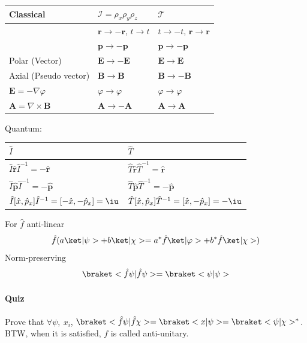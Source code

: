 \begin{center}
  \begin{minipage}[t]{.64\linewidth}
    \centering
    \begin{tabular}{*3l}
      \toprule
      Classical & $\mathcal I = \rho_x \rho_y \rho_z$ & $\mathcal T$\\
      \midrule
      & $\bm r \to -\bm r$, $t \to t$ &
      $t \to -t$, $\bm r \to \bm r$\\
      & $\bm p \to -\bm p$ & $\bm p \to -\bm p$\\
      \midrule
      Polar (Vector) & $\bm E \to -\bm E$ & $\bm E \to \bm E$\\
      Axial (Pseudo vector) & $\bm B \to \bm B$ & $\bm B \to -\bm B$\\
      $\bm E = -\nabla\varphi$ & $\varphi \to \varphi$ & $\varphi \to \varphi$\\
      $\bm A = \nabla \times \bm B$ & $\bm A \to -\bm A$ & $\bm A \to \bm A$\\
      \bottomrule
    \end{tabular}
  \end{minipage} \hfill
  \begin{minipage}[t]{.32\linewidth}
  Quantum:

  \begin{tabular}{ll}
    \toprule
    $\hat I$ & $\hat T$\\
    \midrule
    $\hat I \hat{\bm r} \hat I^{-1} = -\hat{\bm r}$ &
    $\hat T\hat{\bm r}\hat T^{-1} = \hat{\bm r}$\\
    $\hat I \hat{\bm p} \hat I^{-1} = -\hat{\bm p}$ &
    $\hat T\hat{\bm p}\hat T^{-1} = -\hat{\bm p}$\\
    $\hat I[\hat x, \hat p_x]\hat I^{-1} = [-\hat x, -\hat p_x] = \iu$ &
    $\hat T[\hat x, \hat p_x]\hat T^{-1} = [\hat x, -\hat p_x] = -\iu$\\
    \bottomrule
  \end{tabular}
  \end{minipage}
\end{center}

For $\hat f$ anti-linear
\[
  \hat f(a\ket|\psi> + b\ket|\chi>
= a^*\hat f\ket|\varphi> + b^*\hat f\ket|\chi>)
\]
Norm-preserving
\[
  \braket<\hat f\psi|\hat f\psi> = \braket<\psi|\psi>
\]
\paragraph{Quiz}
Prove that $\forall \psi,\ x_i$,
$\braket<\hat f\psi|\hat f\chi> = \braket<x|\psi> = \braket<\psi|\chi>^*$.
BTW, when it is satisfied, $f$ is called anti-unitary.

